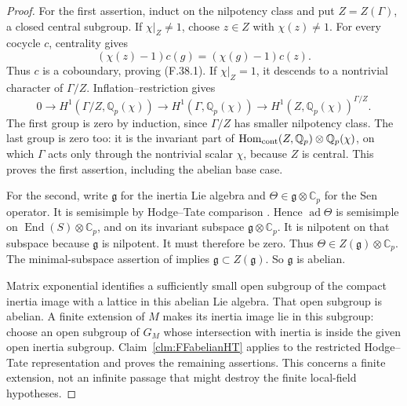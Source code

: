 \documentclass[11pt]{article}
\begin{document}
\begin{proof}
For the first assertion, induct on the
nilpotency class and put \(Z=Z(\Gamma)\), a closed central subgroup. If
\(\chi|_Z\ne1\), choose \(z\in Z\)
with \(\chi(z)\ne1\). For every cocycle
\(c\), centrality gives
\[
             (\chi(z)-1)c(g)=(\chi(g)-1)c(z).
\]
Thus \(c\) is a coboundary, proving
(F.38.1). If \(\chi|_Z=1\), it descends
to a nontrivial character of \(\Gamma/Z\).
Inflation--restriction gives
\[
 0\longrightarrow H^1(\Gamma/Z,\mathbb Q_p(\chi))
 \longrightarrow H^1(\Gamma,\mathbb Q_p(\chi))
 \longrightarrow H^1(Z,\mathbb Q_p(\chi))^{\Gamma/Z}.
\]
The first group is zero by induction,
since \(\Gamma/Z\) has smaller
nilpotency class. The last group is
zero too: it is the invariant part
of \(\operatorname{Hom}_{\rm cont}(Z,\mathbb Q_p)
\otimes\mathbb Q_p(\chi)\), on which
\(\Gamma\) acts only through the
nontrivial scalar \(\chi\), because
\(Z\) is central. This proves the
first assertion, including the abelian
base case.

For the second, write \(\mathfrak g\)
for the inertia Lie algebra and
\(\Theta\in\mathfrak g\otimes\mathbb C_p\)
for the Sen operator. It is semisimple
by Hodge--Tate comparison
\citep[Section~2.7]{FF_Fontaine2004}.
Hence \(\operatorname{ad}\Theta\)
is semisimple on
\(\operatorname{End}(S)\otimes\mathbb C_p\),
and on its invariant subspace
\(\mathfrak g\otimes\mathbb C_p\).
It is nilpotent on that subspace
because \(\mathfrak g\) is nilpotent.
It must therefore be zero. Thus
\(\Theta\in Z(\mathfrak g)\otimes\mathbb C_p\).
The minimal-subspace assertion of
\citet[Theorem~3.1, \(d=0\)]{FF_Ohkubo2014}
implies
\(\mathfrak g\subset Z(\mathfrak g)\).
So \(\mathfrak g\) is abelian.

Matrix exponential identifies a
sufficiently small open subgroup
of the compact inertia image with
a lattice in this abelian Lie algebra.
That open subgroup is abelian.
A finite extension of \(M\) makes
its inertia image lie in this subgroup:
choose an open subgroup of \(G_M\)
whose intersection with inertia is
inside the given open inertia subgroup.
Claim~\ref{clm:FFabelianHT} applies
to the restricted Hodge--Tate
representation and proves the
remaining assertions. This concerns
a finite extension, not an infinite
passage that might destroy the
finite local-field hypotheses.
\end{proof}
\end{document}

